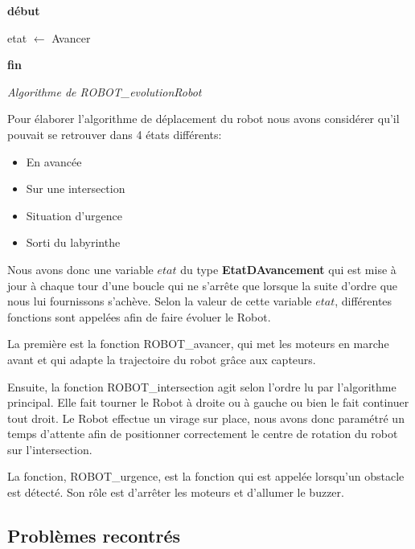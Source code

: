 \documentclass[a4paper,11pt]{article}
\begin{document}
\noindent\textbf{début}

    \begin{algorithm}[H]
        etat $\leftarrow$ Avancer\\
    \end{algorithm}

    \noindent\textbf{fin}
\begin{center}
    \textit{Algorithme de ROBOT\_evolutionRobot}
\end{center}

Pour élaborer l'algorithme de déplacement du robot nous avons considérer qu'il pouvait se retrouver dans 4 états différents:
\begin{itemize}
    \item En avancée
    \item Sur une intersection
    \item Situation d'urgence
    \item Sorti du labyrinthe
\end{itemize} 

Nous avons donc une variable $etat$ du type \textbf{EtatDAvancement} qui est mise à jour à chaque tour d'une boucle qui ne s'arrête que lorsque la suite d'ordre que nous lui fournissons s'achève.
Selon la valeur de cette variable $etat$, différentes fonctions sont appelées afin de faire évoluer le Robot.

La première est la fonction ROBOT\_avancer, qui met les moteurs en marche avant et qui adapte la trajectoire du robot grâce aux capteurs.

Ensuite, la fonction ROBOT\_intersection agit selon l'ordre lu par l'algorithme principal. Elle fait tourner le Robot à droite ou à gauche ou bien le fait continuer tout droit.
Le Robot effectue un virage sur place, nous avons donc paramétré un temps d'attente afin de positionner correctement le centre de rotation du robot sur l'intersection.

La fonction, ROBOT\_urgence, est la fonction qui est appelée lorsqu'un obstacle est détecté. Son rôle est d'arrêter les moteurs et d'allumer le buzzer.

\subsection{Problèmes recontrés}
\end{document}
